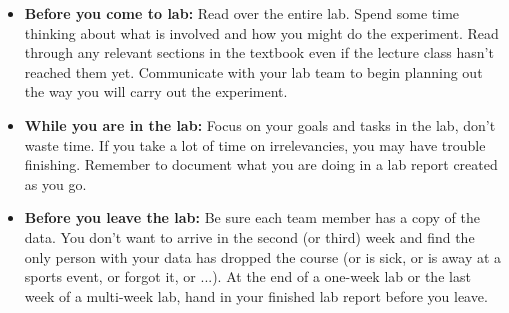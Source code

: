 \begin{itemize}
\setlength\itemsep{2pt}
\item \textbf{Before you come to lab:} Read over the entire lab.
Spend some time thinking about what is involved and how you might do the experiment. Read through any relevant sections in the textbook even if the lecture class hasn't reached them yet. Communicate with your lab team to begin planning out the way you will carry out the experiment.
\item \textbf{While you are in the lab:} Focus on your goals and tasks in the lab, don't waste time. If you take a lot of time on irrelevancies, you may have trouble finishing. Remember to document what you are doing in a lab report created as you go.
\item \textbf{Before you leave the lab:} Be sure each team member has a copy of the data. You don't want to arrive in the second (or third) week and find the only person with your data has dropped the course (or is sick, or is away at a sports event, or forgot it, or ...). At the end of a one-week lab or the last week of a multi-week lab, hand in your finished lab report before you leave.
\end{itemize}

